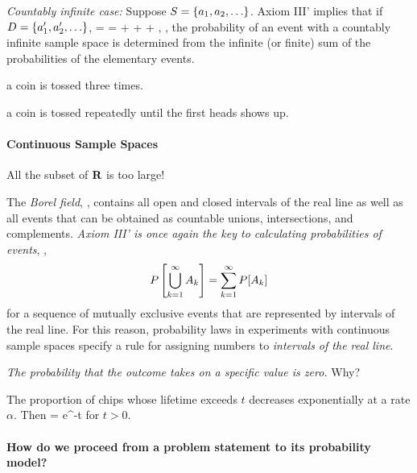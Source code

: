 	\item \emph{Countably infinite case:}
		Suppose $S=\{a_1,a_2,\ldots\}$.
		Axiom III' implies
		that if $D = \{a_1',a_2',\ldots\}$,
		\beq
		=
		= + +  + \cdots,
		\eeq
		\ie,
		the probability of an event with a countably infinite sample space
		is determined from the infinite (or finite) sum of
		the probabilities of the elementary events.

	\item {} a coin is tossed three times.

	\item {} a coin is tossed repeatedly until the first heads shows up.

\eit

\paragraph{Continuous Sample Spaces}

\bit

	\item All the subset of ${\mbox{\bf R}}$ is too large!
	\item The \emph{Borel field}, \borel, contains all open and closed intervals of the real line
	as well as all events that can be obtained as countable unions, intersections,
	and complements.
	\emph{Axiom III' is once again the key to calculating probabilities of events},
	\ie,
	\[
		P\left[\bigcup_{k=1}^\infty A_k\right] = \sum_{k=1}^\infty P[A_k]
	\]
	for a sequence of mutually exclusive events
	that are represented by intervals of the real line.
	For this reason, probability laws in experiments with continuous sample spaces
	specify a rule for assigning numbers to \emph{intervals of the real line}.

	\item \emph{The probability that the outcome takes on a specific value is zero.}
	Why?

	\item {}
	The proportion of chips whose lifetime exceeds $t$
	decreases exponentially at a rate $\alpha$.
	Then
	\beq
		 = e^{-\alpha t}
	\eeq
	for $t>0$.

\eit

\paragraph{How do we proceed from a problem statement to its probability model?}


